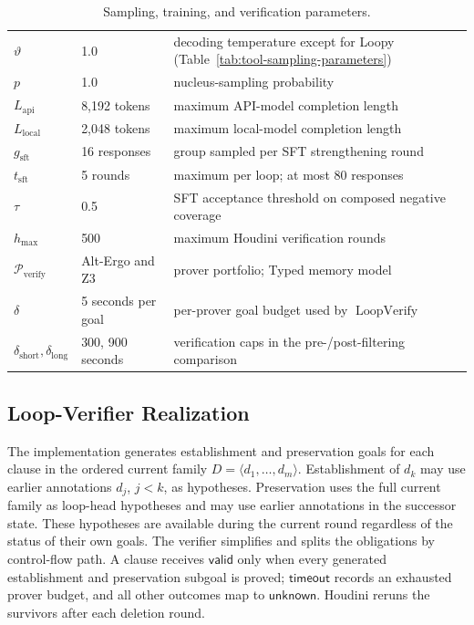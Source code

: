 \begin{table}[H]
\begin{tabular}{p{2.6cm}p{3.1cm}p{5.9cm}}
\(\vartheta\) & 1.0 & decoding temperature except for Loopy (Table~\ref{tab:tool-sampling-parameters}) \\
\(p\) & 1.0 & nucleus-sampling probability \\
\(L_{\mathrm{api}}\) & 8,192 tokens & maximum API-model completion length \\
\(L_{\mathrm{local}}\) & 2,048 tokens & maximum local-model completion length \\
\midrule
\(g_{\mathrm{sft}}\) & 16 responses & group sampled per SFT strengthening round \\
\(t_{\mathrm{sft}}\) & 5 rounds & maximum per loop; at most 80 responses \\
\(\tau\) & 0.5 & SFT acceptance threshold on composed negative coverage \\
\midrule
\(h_{\max}\) & 500 & maximum Houdini verification rounds \\
\(\mathcal P_{\mathrm{verify}}\) & Alt-Ergo and Z3 & prover portfolio; Typed memory model \\
\(\delta\) & 5 seconds per goal & per-prover goal budget used by \(\operatorname{LoopVerify}\) \\
\(\delta_{\mathrm{short}},\delta_{\mathrm{long}}\) & 300, 900 seconds & verification caps in the pre-/post-filtering comparison \\
\bottomrule
\end{tabular}
\caption{Sampling, training, and verification parameters.}
\label{tab:constants}
\end{table}
\subsection{Loop-Verifier Realization}
\label{app:loop-verifier-realization}

The implementation generates establishment and preservation goals for each
clause in the ordered current family \(D=\langle d_1,\ldots,d_m\rangle\).
Establishment of \(d_k\) may use earlier annotations \(d_j\), \(j<k\), as
hypotheses.  Preservation uses the full current family as loop-head
hypotheses and may use earlier annotations in the successor state.  These
hypotheses are available during the current round regardless of the status of
their own goals.  The verifier simplifies and splits the obligations by
control-flow path.  A clause receives \(\mathsf{valid}\) only when every
generated establishment and preservation subgoal is proved;
\(\mathsf{timeout}\) records an exhausted prover budget, and all other
outcomes map to \(\mathsf{unknown}\).  Houdini reruns the survivors after each
deletion round.

